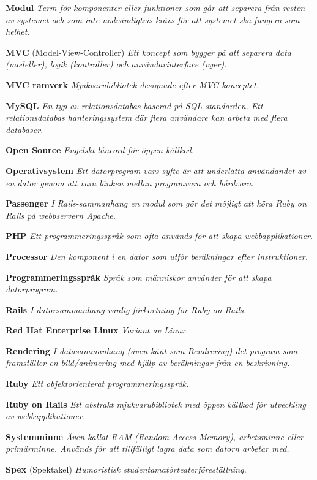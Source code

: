 \documentclass[a4paper, twoside, 11pt, titlepage]{article}
\begin{document}
	\textbf{Modul} \emph{Term för komponenter eller funktioner som går att separera från resten av systemet och som inte nödvändigtvis krävs för att systemet ska fungera som helhet.}

	\textbf{MVC} (Model-View-Controller) \emph{Ett koncept som bygger på att separera data (modeller), logik (kontroller) och användarinterface (vyer).}

	\textbf{MVC ramverk} \emph{Mjukvarubibliotek designade efter MVC-konceptet.}

	\textbf{MySQL} \emph{En typ av relationsdatabas baserad på SQL-standarden. Ett relationsdatabas hanteringssystem där flera användare kan arbeta med flera databaser.}

	\textbf{Open Source} \emph{Engelskt låneord för öppen källkod.}

	\textbf{Operativsystem} \emph{Ett datorprogram vars syfte är att underlätta användandet av en dator genom att vara länken mellan programvara och hårdvara.}

	\textbf{Passenger} \emph{I Rails-sammanhang en modul som gör det möjligt att köra Ruby on Rails på webbservern Apache.}

	\textbf{PHP} \emph{Ett programmeringsspråk som ofta används för att skapa webbapplikationer.}

	\textbf{Processor} \emph{Den komponent i en dator som utför beräkningar efter instruktioner.}

	\textbf{Programmeringsspråk} \emph{Språk som människor använder för att skapa datorprogram.}

	\textbf{Rails} \emph{I datorsammanhang vanlig förkortning för Ruby on Rails.}

	\textbf{Red Hat Enterprise Linux} \emph{Variant av Linux.}

	\textbf{Rendering} \emph{I datasammanhang (även känt som Rendrering) det program som framställer en bild/animering med hjälp av beräkningar från en beskrivning.}

	\textbf{Ruby} \emph{Ett objektorienterat programmeringsspråk.}

	\textbf{Ruby on Rails} \emph{Ett abstrakt mjukvarubibliotek med öppen källkod för utveckling av webbapplikationer.}

	\textbf{Systemminne} \emph{Även kallat RAM (Random Access Memory), arbetsminne eller primärminne. Används för att tillfälligt lagra data som datorn arbetar med.}

	\textbf{Spex} (Spektakel) \emph{Humoristisk studentamatörteaterföreställning.}
\end{document}
